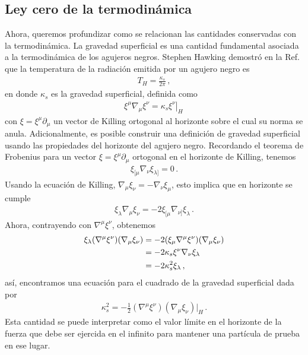 \documentclass[../Main.tex]{subfiles}
\begin{document}
       

















\subsection{Ley cero de la termodinámica}
Ahora, queremos profundizar como se relacionan las cantidades conservadas con la termodinámica. La gravedad superficial es una cantidad fundamental asociada a la termodinámica de los agujeros negros. Stephen Hawking demostró en la Ref.~\cite{Hawking:1975vcx} que la temperatura de la radiación emitida por un agujero negro es
\begin{align}
T_{H}=\frac{\kappa_s}{2\pi}\, ,\label{temp}
\end{align}
en donde $\kappa_s$ es la gravedad superficial, definida como 
\begin{align}
\xi^{\mu} \nabla_{\mu} \xi^{\nu}=\left.\kappa_s \xi^\nu\right|_H \, \label{surfgrav}
\end{align}
con $\xi=\xi^\mu \partial_\mu$ un vector de Killing ortogonal al horizonte sobre el cual su norma se anula. Adicionalmente, es posible construir una definición de gravedad superficial usando las propiedades del horizonte del agujero negro. Recordando el teorema de Frobenius para un vector $\xi=\xi^\mu \partial_\mu$ ortogonal en el horizonte de Killing, tenemos
\begin{align}
    \xi_{[\mu} \nabla_{\nu} \xi_{\lambda]}=0 \, .
\end{align}
Usando la ecuación de Killing, $\nabla_{\mu}\xi_{\nu}=-\nabla_{\nu}\xi_{\mu}$, esto implica que en horizonte se cumple
\begin{align}
\xi_{\lambda} \nabla_{\mu}\xi_{\nu}=-2\xi_{[\mu}\nabla_{\nu]}\xi_{\lambda}\, .
\end{align}
Ahora, contrayendo con $\nabla^{\mu}\xi^{\nu}$, obtenemos
\begin{align}\notag
\xi_{\lambda}(\nabla^{\mu}\xi^{\nu}) (\nabla_{\mu}\xi_{\nu})&=-2(\xi_{\mu}\nabla^{\mu}\xi^{\nu})(\nabla_{\mu}\xi_{\nu})\\ \notag
&=-2\kappa_{s}\xi^{\nu}\nabla_{\nu}\xi_{\lambda}\\ 
&=-2\kappa_{s}^2 \xi_{\lambda}\, ,
\end{align}
así, encontramos una ecuación para el cuadrado de la gravedad superficial dada por
\begin{align}
    \kappa_{s}^2=-\frac{1}{2}(\nabla^{\mu}\xi^{\nu}) (\nabla_{\mu}\xi_{\nu})|_H\, . \label{surfgrav2}
\end{align} 
Esta cantidad se puede interpretar como el valor límite en el horizonte de la fuerza que debe ser ejercida en el infinito para mantener una partícula de prueba en ese lugar. 
\end{document}
